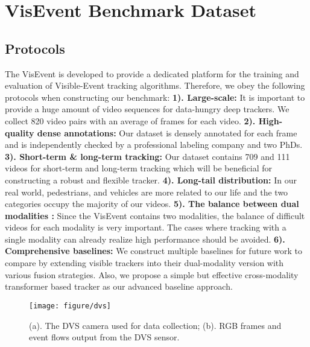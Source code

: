 \documentclass[journal]{IEEEtran}
\begin{document}
\section{VisEvent Benchmark Dataset}  

 
\subsection{Protocols } 
The VisEvent is developed to provide a dedicated platform for the training and evaluation of Visible-Event tracking algorithms. Therefore, we obey the following protocols when constructing our benchmark:
\textbf{1). Large-scale:} It is important to provide a huge amount of video sequences for data-hungry deep trackers. We collect 820 video pairs with an average of  frames for each video. 
\textbf{2). High-quality dense annotations:} Our dataset is densely annotated for each frame and is independently checked by a professional labeling company and two PhDs.    
\textbf{3). Short-term \& long-term tracking:} Our dataset contains 709 and 111 videos for short-term and long-term tracking which will be beneficial for constructing a robust and flexible tracker. 
\textbf{4). Long-tail distribution:} In our real world, pedestrians, and vehicles are more related to our life and the two categories occupy the majority of our videos. 
\textbf{5). The balance between dual modalities :} Since the VisEvent contains two modalities, the balance of difficult videos for each modality is very important. The cases where tracking with a single modality can already realize high performance should be avoided.  
\textbf{6). Comprehensive baselines:} We construct multiple baselines for future work to compare by extending visible trackers into their dual-modality version with various fusion strategies. Also, we propose a simple but effective cross-modality transformer based tracker as our advanced baseline approach. 



\begin{figure} 
\center
\texttt{[image: figure/dvs]}
\caption{ (a). The DVS camera used for data collection;  (b). RGB frames and event flows output from the DVS sensor. }
\label{dvs}
\end{figure} 
\end{document}
